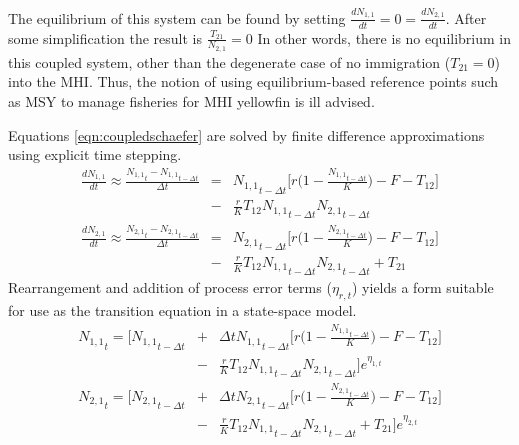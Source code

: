 \documentclass[12pt,letterpaper]{article}
\newcommand\None{{N_{1,1}}}
\newcommand\Ntwo{{N_{2,1}}}
\newcommand\prevN[1]{{#1_{t-\Delta t}}}
\newcommand\nextN[1]{{#1_t}}
\begin{document}
The equilibrium of this system can be found by setting
$\frac{d\None}{dt} = 0 = \frac{d\Ntwo}{dt}$. After some simplification
the result is $\frac{T_{21}}{\Ntwo} = 0$ In other words, there is no
equilibrium in this coupled system, other than the degenerate case of
no immigration ($T_{21}=0$) into the MHI. Thus, the notion of using
equilibrium-based reference points such as MSY to manage fisheries for
MHI yellowfin is ill advised.

Equations \ref{eqn:coupledschaefer} are solved by finite difference
approximations using explicit time stepping.
\begin{eqnarray}
\frac{d\None}{dt}\approx\frac{\nextN{\None}-\prevN{\None}}{\Delta t}&=&
\prevN{\None}\Big[r\Big(1-\frac{\prevN{\None}}{K}\Big)
-F - T_{12}\Big]  \nonumber\\
&-& \frac{r}{K}T_{12}\prevN{\None}\prevN{\Ntwo}\nonumber\\
\frac{d\Ntwo}{dt}\approx\frac{\nextN{\Ntwo}-\prevN{\Ntwo}}{\Delta t}&=&
\prevN{\Ntwo}\Big[r\Big(1-\frac{\prevN{\Ntwo}}{K}\Big)
-F - T_{12}\Big]  \nonumber\\
&-& \frac{r}{K}T_{12}\prevN{\None}\prevN{\Ntwo} + T_{21}
\end{eqnarray}
Rearrangement and addition of process error terms ($\eta_{r,t}$)
yields a form suitable for use as the transition equation in a state-space
model.
\begin{eqnarray}
\nextN{\None}=\Bigg[\prevN{\None}&+&{\Delta t}
\prevN{\None}\Big[r\Big(1-\frac{\prevN{\None}}{K}\Big)
-F - T_{12}\Big]\nonumber\\
&-&\frac{r}{K}T_{12}\prevN{\None}\prevN{\Ntwo}
\Bigg]e^{\eta_{1,t}}\nonumber\\
\nextN{\Ntwo}=\Bigg[\prevN{\Ntwo}&+&{\Delta t}
\prevN{\Ntwo}\Big[r\Big(1-\frac{\prevN{\Ntwo}}{K}\Big)
-F - T_{12}\Big]\nonumber\\
&-&\frac{r}{K}T_{12}\prevN{\None}\prevN{\Ntwo}
+T_{21}\Bigg]e^{\eta_{2,t}}
\label{eqn:finitecoupledschaefer}
\end{eqnarray}
\end{document}
